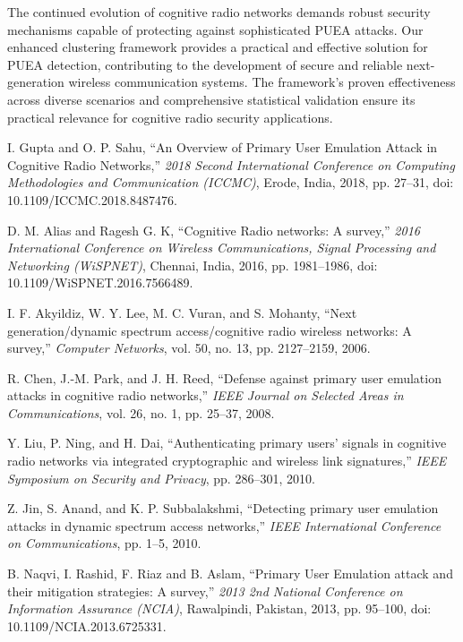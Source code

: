 \documentclass[pdflatex,sn-mathphys-num]{sn-jnl}%
\theoremstyle{thmstyleone}
\theoremstyle{thmstyletwo}
\theoremstyle{thmstylethree}
\begin{document}
The continued evolution of cognitive radio networks demands robust security mechanisms capable of protecting against sophisticated PUEA attacks. Our enhanced clustering framework provides a practical and effective solution for PUEA detection, contributing to the development of secure and reliable next-generation wireless communication systems. The framework's proven effectiveness across diverse scenarios and comprehensive statistical validation ensure its practical relevance for cognitive radio security applications.

\newpage
\begin{thebibliography}{25}

I. Gupta and O. P. Sahu, ``An Overview of Primary User Emulation Attack in Cognitive Radio Networks,'' \emph{2018 Second International Conference on Computing Methodologies and Communication (ICCMC)}, Erode, India, 2018, pp. 27--31, doi: 10.1109/ICCMC.2018.8487476.

D. M. Alias and Ragesh G. K, ``Cognitive Radio networks: A survey,'' \emph{2016 International Conference on Wireless Communications, Signal Processing and Networking (WiSPNET)}, Chennai, India, 2016, pp. 1981--1986, doi: 10.1109/WiSPNET.2016.7566489.

I. F. Akyildiz, W. Y. Lee, M. C. Vuran, and S. Mohanty, ``Next generation/dynamic spectrum access/cognitive radio wireless networks: A survey,'' \emph{Computer Networks}, vol. 50, no. 13, pp. 2127--2159, 2006.

R. Chen, J.-M. Park, and J. H. Reed, ``Defense against primary user emulation attacks in cognitive radio networks,'' \emph{IEEE Journal on Selected Areas in Communications}, vol. 26, no. 1, pp. 25--37, 2008.

Y. Liu, P. Ning, and H. Dai, ``Authenticating primary users' signals in cognitive radio networks via integrated cryptographic and wireless link signatures,'' \emph{IEEE Symposium on Security and Privacy}, pp. 286--301, 2010.

Z. Jin, S. Anand, and K. P. Subbalakshmi, ``Detecting primary user emulation attacks in dynamic spectrum access networks,'' \emph{IEEE International Conference on Communications}, pp. 1--5, 2010.

B. Naqvi, I. Rashid, F. Riaz and B. Aslam, ``Primary User Emulation attack and their mitigation strategies: A survey,'' \emph{2013 2nd National Conference on Information Assurance (NCIA)}, Rawalpindi, Pakistan, 2013, pp. 95--100, doi: 10.1109/NCIA.2013.6725331.


\end{thebibliography}
\end{document}
